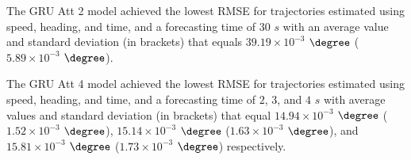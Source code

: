 The GRU Att 2 model achieved the lowest RMSE for trajectories estimated using speed, heading, and time, and a forecasting time of $30$ $s$ with an average value and standard deviation (in brackets) that equals $39.19 \times 10^{-3}$ $\degree$ ($5.89 \times 10^{-3}$ $\degree$).

The GRU Att 4 model achieved the lowest RMSE for trajectories estimated using speed, heading, and time, and a forecasting time of $2$, $3$, and $4$ $s$ with average values and standard deviation (in brackets) that equal $14.94 \times 10^{-3}$ $\degree$ ($1.52 \times 10^{-3}$ $\degree$), $15.14 \times 10^{-3}$ $\degree$ ($1.63 \times 10^{-3}$ $\degree$), and $15.81 \times 10^{-3}$ $\degree$ ($1.73 \times 10^{-3}$ $\degree$) respectively.

